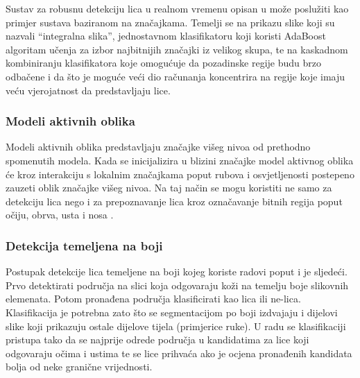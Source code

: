 \documentclass[times, utf8, seminar, numeric]{fer}
\begin{document}
Sustav za robusnu detekciju lica u realnom vremenu opisan u \cite{Viola04robustreal-time} može poslužiti kao primjer sustava baziranom na značajkama. Temelji se na prikazu slike koji su nazvali “integralna slika”, jednostavnom klasifikatoru koji koristi AdaBoost algoritam učenja za izbor najbitnijih značajki iz velikog skupa, te na kaskadnom kombiniranju klasifikatora koje omogućuje da pozadinske regije budu brzo odbačene i da što je moguće veći dio računanja koncentrira na regije koje imaju veću vjerojatnost da predstavljaju lice.

\subsubsection{Modeli aktivnih oblika}

Modeli aktivnih oblika predstavljaju značajke višeg nivoa od prethodno spomenutih modela. Kada se inicijalizira u blizini značajke model aktivnog oblika će kroz interakciju s lokalnim značajkama poput rubova i osvjetljenosti postepeno zauzeti oblik značajke višeg nivoa. Na taj način se mogu koristiti ne samo za detekciju lica nego i za prepoznavanje lica kroz označavanje bitnih regija poput očiju, obrva, usta i nosa \cite{prabhu_utsav_facialrecog}.

\subsubsection{Detekcija temeljena na boji}

Postupak detekcije lica temeljene na boji kojeg koriste radovi poput \cite{Senior:2002:FDC:513073.513082} i \cite{conf/isda/ChandrappaR12} je sljedeći. Prvo detektirati područja na slici koja odgovaraju koži na temelju boje slikovnih elemenata. Potom pronađena područja klasificirati kao lica ili ne-lica.  Klasifikacija je potrebna zato što se segmentacijom po boji izdvajaju i dijelovi slike koji prikazuju ostale dijelove tijela (primjerice ruke). U radu \cite{Senior:2002:FDC:513073.513082} se klasifikaciji pristupa tako da se najprije odrede područja u kandidatima za lice koji odgovaraju očima i ustima te se lice prihvaća ako je ocjena pronađenih kandidata bolja od neke granične vrijednosti. 
\end{document}
